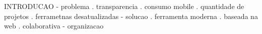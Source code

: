 INTRODUCAO
    - problema
        . transparencia
        . consumo mobile
        . quantidade de projetos
        . ferrametnas desatualizadas
    - solucao
        . ferramenta moderna
        . baseada na web
        . colaborativa
    - organizacao
